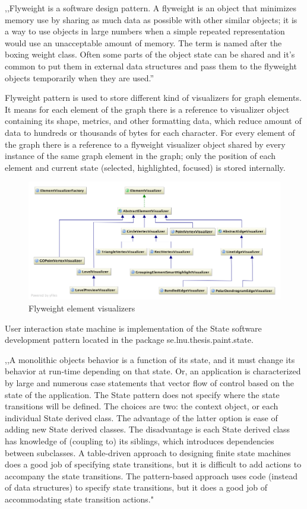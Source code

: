 ,,Flyweight is a software design pattern. A flyweight is an object that minimizes memory use by sharing as much data as possible with other similar objects; it is a way to use objects in large numbers when a simple repeated representation would use an unacceptable amount of memory. The term is named after the boxing weight class. Often some parts of the object state can be shared and it's common to put them in external data structures and pass them to the flyweight objects temporarily when they are used.''~\cite{FLYWEIGHT}

Flyweight pattern is used to store different kind of visualizers for graph elements. It means for each element of the graph there is a reference to visualizer object containing its shape, metrics, and other formatting data, which reduce amount of data to hundreds or thousands of bytes for each character. For every element of the graph there is a reference to a flyweight visualizer object shared by every instance of the same graph element in the graph; only the position of each element and current state (selected, highlighted, focused) is stored internally.

\begin{figure}[h!]
\centering
\includegraphics[scale=0.35]{pictures/uml_visualizers.png}
\caption{Flyweight element visualizers}
\label{fig:uml_visualizers}
\end{figure}

User interaction state machine is implementation of the State software development pattern located in the package \textsf{se.lnu.thesis.paint.state}. 

,,A monolithic objects behavior is a function of its state, and it must change its behavior at run-time depending on that state. Or, an application is characterized by large and numerous case statements that vector flow of control based on the state of the application. The State pattern does not specify where the state transitions will be defined. The choices are two: the context object, or each individual State derived class. The advantage of the latter option is ease of adding new State derived classes. The disadvantage is each State derived class has knowledge of (coupling to) its siblings, which introduces dependencies between subclasses. A table-driven approach to designing finite state machines does a good job of specifying state transitions, but it is difficult to add actions to accompany the state transitions. The pattern-based approach uses code (instead of data structures) to specify state transitions, but it does a good job of accommodating state transition actions."~\cite{STATE}

